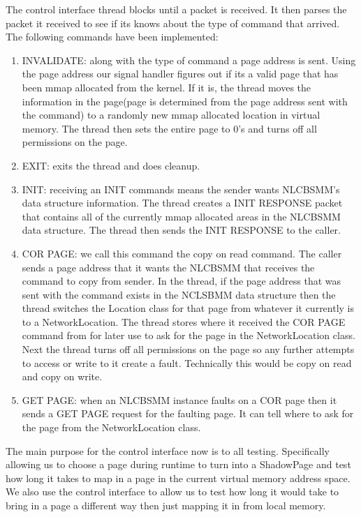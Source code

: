 \documentclass[9pt]{sig-alternate-10pt}
\begin{document}
The control interface thread blocks until a packet is received. It then parses the packet it received to see if its knows about the type of command that arrived. The following commands have been implemented:
\begin{enumerate}
\item INVALIDATE: along with the type of command a page address is sent. Using the page address our signal handler figures out if its a valid page that has been mmap allocated from the kernel. If it is, the thread moves the information in the page(page is determined from the page address sent with the command) to a randomly new mmap allocated location in virtual memory. The thread then sets the entire page to 0's and turns off all permissions on the page.
\item EXIT: exits the thread and does cleanup.
\item INIT: receiving an INIT commands means the sender wants NLCBSMM's data structure information. The thread creates a INIT RESPONSE packet that contains all of the currently mmap allocated areas in the NLCBSMM data structure. The thread then sends the INIT RESPONSE to the caller.
\item COR PAGE: we call this command the copy on read command. The caller sends a page address that it wants the NLCBSMM that receives the command to copy from sender. In the thread, if the page address that was sent with the command exists in the NCLSBMM data structure then the thread switches the Location class for that page from whatever it currently is to a NetworkLocation. The thread stores where it received the COR PAGE command from for later use to ask for the page in the NetworkLocation class. Next the thread turns off all permissions on the page so any further attempts to access or write to it create a fault. Technically this would be copy on read and copy on write. 
\item GET PAGE: when an NLCBSMM instance faults on a COR page then it sends a GET PAGE request for the faulting page. It can tell where to ask for the page from the NetworkLocation class. 
\end{enumerate}

The main purpose for the control interface now is to all testing. Specifically allowing us to choose a page during runtime to turn into a ShadowPage and test how long it takes to map in a page in the current virtual memory address space. We also use the control interface to allow us to test how long it would take to bring in a page a different way then just mapping it in from local memory.
\end{document}
